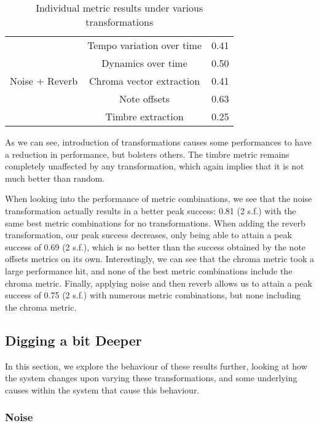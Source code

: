 \documentclass[oneside, class=book, 12pt, crop=false]{standalone}
\begin{document}
\begin{table}[h]
\begin{tabular}{c|cc}
        \multirow{5}{*}{Noise + Reverb} & Tempo variation over time & 0.41 \\ \cline{2-3}
                                &Dynamics over time & 0.50 \\ \cline{2-3}
                                &Chroma vector extraction & 0.41 \\ \cline{2-3}
                                &Note offsets &  0.63\\ \cline{2-3}
                                &Timbre extraction & 0.25 \\ 
        
    \end{tabular}
    \caption{Individual metric results under various transformations}
    \label{table:transformation results}
\end{table}



As we can see, introduction of transformations causes some performances to have a reduction in performance, but bolsters others. The timbre metric remains completely unaffected by any transformation, which again implies that it is not much better than random.

When looking into the performance of metric combinations, we see that the noise transformation actually results in a better peak success: 0.81 (2 s.f.) with the same best metric combinations for no transformations. When adding the reverb transformation, our peak success decreases, only being able to attain a peak success of 0.69 (2 s.f.), which is no better than the success obtained by the note offsets metrics on its own. Interestingly, we can see that the chroma metric took a large performance hit, and none of the best metric combinations include the chroma metric. Finally, applying noise and then reverb allows us to attain a peak success of 0.75 (2 s.f.) with numerous metric combinations, but none including the chroma metric.

\subsection{Digging a bit Deeper}

In this section, we explore the behaviour of these results further, looking at how the system changes upon varying these transformations, and some underlying causes within the system that cause this behaviour.

\subsubsection{Noise}
\end{document}
